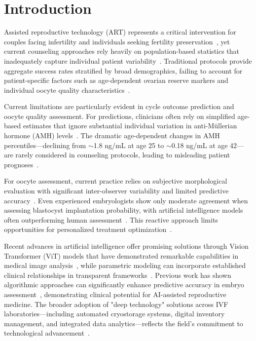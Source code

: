 \documentclass[pdflatex,sn-basic]{sn-jnl}%
\begin{document}
\maketitle

\section{Introduction}\label{sec:introduction}

Assisted reproductive technology (ART) represents a critical intervention for couples facing infertility and individuals seeking fertility preservation~\cite{hfea2024statistics,sart2024national}, yet current counseling approaches rely heavily on population-based statistics that inadequately capture individual patient variability~\cite{gameiro2023understanding}. Traditional protocols provide aggregate success rates stratified by broad demographics, failing to account for patient-specific factors such as age-dependent ovarian reserve markers and individual oocyte quality characteristics~\cite{asrm2017embryo}.

Current limitations are particularly evident in cycle outcome prediction and oocyte quality assessment. For predictions, clinicians often rely on simplified age-based estimates that ignore substantial individual variation in anti-Müllerian hormone (AMH) levels~\cite{seifer2002amh,ovarian_reserve_testing}. The dramatic age-dependent changes in AMH percentiles—declining from $\sim$1.8 ng/mL at age 25 to $\sim$0.18 ng/mL at age 42—are rarely considered in counseling protocols, leading to misleading patient prognoses~\cite{lee2017amh,song2021amh}.

For oocyte assessment, current practice relies on subjective morphological evaluation with significant inter-observer variability and limited predictive accuracy~\cite{paternot2009observer,paternot2011multicentre,fordham2022embryologist}. Even experienced embryologists show only moderate agreement when assessing blastocyst implantation probability, with artificial intelligence models often outperforming human assessment~\cite{fordham2022embryologist}. This reactive approach limits opportunities for personalized treatment optimization~\cite{racowsky2010standardization}.

Recent advances in artificial intelligence offer promising solutions through Vision Transformer (ViT) models that have demonstrated remarkable capabilities in medical image analysis~\cite{dosovitskiy2021image,alhammuri2023vision}, while parametric modeling can incorporate established clinical relationships in transparent frameworks~\cite{rudin2019stop}. Previous work has shown algorithmic approaches can significantly enhance predictive accuracy in embryo assessment~\cite{rave2024bonna,silver2020datadriven}, demonstrating clinical potential for AI-assisted reproductive medicine. The broader adoption of "deep technology" solutions across IVF laboratories—including automated cryostorage systems, digital inventory management, and integrated data analytics—reflects the field's commitment to technological advancement~\cite{go2023deep}.
\end{document}
